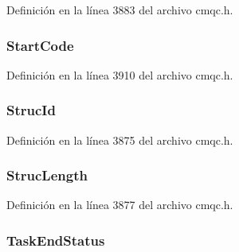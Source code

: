 Definición en la línea 3883 del archivo cmqc.\+h.

\hypertarget{structtag_m_q_c_i_h_a66782f3645541671a5671df7c6570866}{}
\subsubsection[{Start\+Code}]{ Start\+Code}\label{structtag_m_q_c_i_h_a66782f3645541671a5671df7c6570866}


Definición en la línea 3910 del archivo cmqc.\+h.

\hypertarget{structtag_m_q_c_i_h_a0530922ca944569b52601d74941f96e4}{}
\subsubsection[{Struc\+Id}]{ Struc\+Id}\label{structtag_m_q_c_i_h_a0530922ca944569b52601d74941f96e4}


Definición en la línea 3875 del archivo cmqc.\+h.

\hypertarget{structtag_m_q_c_i_h_a830af9a4a08c015b9a4b2d39d4d3420a}{}
\subsubsection[{Struc\+Length}]{ Struc\+Length}\label{structtag_m_q_c_i_h_a830af9a4a08c015b9a4b2d39d4d3420a}


Definición en la línea 3877 del archivo cmqc.\+h.

\hypertarget{structtag_m_q_c_i_h_a1652e24048499b4f9f35349a49911eb0}{}
\subsubsection[{Task\+End\+Status}]{ Task\+End\+Status}\label{structtag_m_q_c_i_h_a1652e24048499b4f9f35349a49911eb0}


